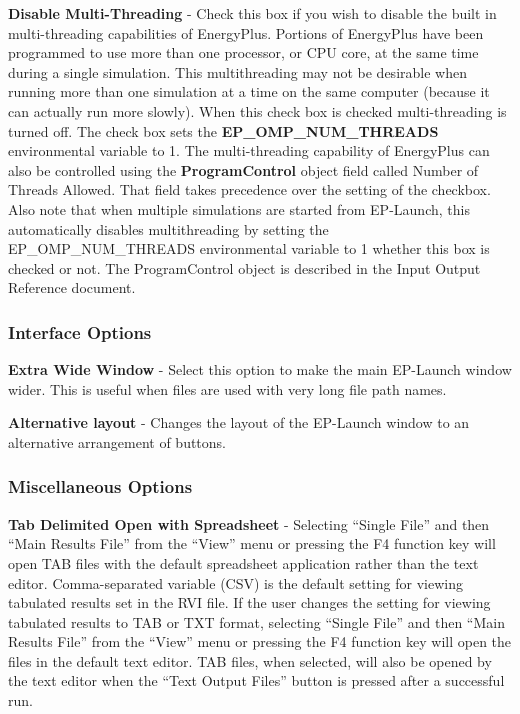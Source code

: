 \textbf{Disable Multi-Threading} - Check this box if you wish to disable the built in multi-threading capabilities of EnergyPlus. Portions of EnergyPlus have been programmed to use more than one processor, or CPU core, at the same time during a single simulation. This multithreading may not be desirable when running more than one simulation at a time on the same computer (because it can actually run more slowly). When this check box is checked multi-threading is turned off. The check box sets the \textbf{EP\_OMP\_NUM\_THREADS} environmental variable to 1. The multi-threading capability of EnergyPlus can also be controlled using the \textbf{ProgramControl} object field called Number of Threads Allowed. That field takes precedence over the setting of the checkbox. Also note that when multiple simulations are started from EP-Launch, this automatically disables multithreading by setting the EP\_OMP\_NUM\_THREADS environmental variable to 1 whether this box is checked or not. The ProgramControl object is described in the Input Output Reference document.

\subsubsection{Interface Options}\label{interface-options}

\textbf{Extra Wide Window} - Select this option to make the main EP-Launch window wider. This is useful when files are used with very long file path names.

\textbf{Alternative layout} - Changes the layout of the EP-Launch window to an alternative arrangement of buttons.

\subsubsection{Miscellaneous Options}\label{miscellaneous-options}

\textbf{Tab Delimited Open with Spreadsheet} - Selecting ``Single File'' and then ``Main Results File'' from the ``View'' menu or pressing the F4 function key will open TAB files with the default spreadsheet application rather than the text editor. Comma-separated variable (CSV) is the default setting for viewing tabulated results set in the RVI file. If the user changes the setting for viewing tabulated results to TAB or TXT format, selecting ``Single File'' and then ``Main Results File'' from the ``View'' menu or pressing the F4 function key will open the files in the default text editor. TAB files, when selected, will also be opened by the text editor when the ``Text Output Files'' button is pressed after a successful run.

